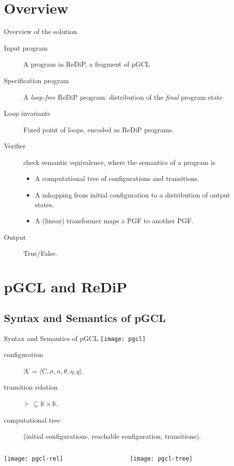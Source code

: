 \documentclass[8pt]{beamer}
\begin{document}
\section{Overview}
\begin{frame}{Overview of the solution}
	\begin{description}
		\item[Input program] A program in ReDiP, a fragment of pGCL
		\item[Specification program] A \emph{loop-free} ReDiP program: distribution of the \emph{final} program state
		\item[Loop invariants] Fixed point of loops, encoded as ReDiP programs.
		\item[Verifier] check semantic equivalence, where the semantics of a program is
		      \begin{itemize}
			      \item A computational tree of configurations and transitions.
			      \item A mhapping from initial configuration to a distribution of output states.
			      \item A (linear) transformer maps a PGF to another PGF.
		      \end{itemize}
		\item[Output] True/False.
	\end{description}
\end{frame}

\section{pGCL and ReDiP}
\subsection{Syntax and Semantics of pGCL}
\begin{frame}[allowframebreaks]{Syntax and Semantics of pGCL\cite{pgcl}}
	\texttt{[image: pgcl]}
	\begin{description}
		\item[configuration] \(\mathcal{K} = \langle C,\sigma,n,\theta,\eta,q\rangle\).
		\item[transition relation] \(\vdash \subseteq \mathbb{K}\times\mathbb{K}\).
		\item[computational tree] (initial configurations, reachable configuration, transitions).
	\end{description}
	\framebreak
	\begin{columns}
		\begin{column}{0.5\textwidth}
			\texttt{[image: pgcl-rel]}
		\end{column}
		\begin{column}{0.5\textwidth}
			\texttt{[image: pgcl-tree]}
		\end{column}
	\end{columns}
\end{frame}
\end{document}
